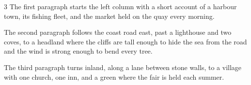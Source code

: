 \documentclass{article}
\begin{document}
\begin{multicols}{3}
The first paragraph starts the left column with a short account of a harbour town,
its fishing fleet, and the market held on the quay every morning.

The second paragraph follows the coast road east, past a lighthouse and two
coves, to a headland where the cliffs are tall enough to hide the sea from the road
and the wind is strong enough to bend every tree.

The third paragraph turns inland, along a lane between stone walls, to a village
with one church, one inn, and a green where the fair is held each summer.
\end{multicols}
\end{document}
